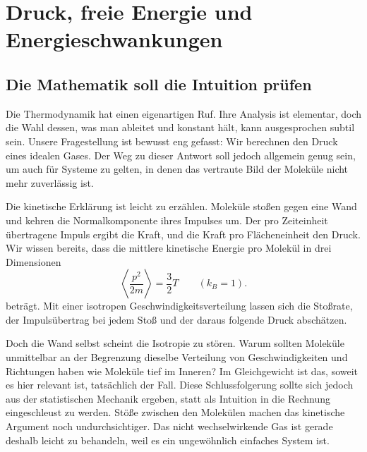 \chapter{Druck, freie Energie und Energieschwankungen}


\section{Die Mathematik soll die Intuition prüfen}

Die Thermodynamik hat einen eigenartigen Ruf. Ihre Analysis ist elementar, doch die Wahl dessen, was man ableitet und konstant hält, kann ausgesprochen subtil sein. Unsere Fragestellung ist bewusst eng gefasst: Wir berechnen den Druck eines idealen Gases. Der Weg zu dieser Antwort soll jedoch allgemein genug sein, um auch für Systeme zu gelten, in denen das vertraute Bild der Moleküle nicht mehr zuverlässig ist.

Die kinetische Erklärung ist leicht zu erzählen. Moleküle stoßen gegen eine Wand und kehren die Normalkomponente ihres Impulses um. Der pro Zeiteinheit übertragene Impuls ergibt die Kraft, und die Kraft pro Flächeneinheit den Druck. Wir wissen bereits, dass die mittlere kinetische Energie pro Molekül in drei Dimensionen \begin{equation}
 \left\langle \frac{p^2}{2m}\right\rangle=\frac{3}{2}T
 \qquad (k_B=1).
 \label{eq:sm5-mean-kinetic-energy}
\end{equation} beträgt. Mit einer isotropen Geschwindigkeitsverteilung lassen sich die Stoßrate, der Impulsübertrag bei jedem Stoß und der daraus folgende Druck abschätzen.

Doch die Wand selbst scheint die Isotropie zu stören. Warum sollten Moleküle unmittelbar an der Begrenzung dieselbe Verteilung von Geschwindigkeiten und Richtungen haben wie Moleküle tief im Inneren? Im Gleichgewicht ist das, soweit es hier relevant ist, tatsächlich der Fall. Diese Schlussfolgerung sollte sich jedoch aus der statistischen Mechanik ergeben, statt als Intuition in die Rechnung eingeschleust zu werden. Stöße zwischen den Molekülen machen das kinetische Argument noch undurchsichtiger. Das nicht wechselwirkende Gas ist gerade deshalb leicht zu behandeln, weil es ein ungewöhnlich einfaches System ist.

